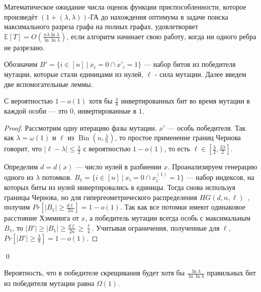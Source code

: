\documentclass[times]{itmo-student-thesis}
\newcommand{\ollga}{${(1 + (\lambda , \lambda))}$-ГА\xspace}
\DeclareMathOperator{\Bin}{Bin}
\begin{document}
\begin{theorem} \label{thm:time}
    Математическое ожидание числа оценок функции приспособленности, которое произведёт \ollga до нахождения оптимума в задаче поиска максимального разреза графа на полных графах, удовлетворяет $\mathbb{E}[T]=O(\frac{n\lambda \ln \lambda}{\ln \ln \lambda})$, если алгоритм начинает свою работу, когда ни одного ребра не разрезано.
\end{theorem}

Обозначим $B' = \{i \in [n] ~|~ x_i = 0 \cap x'_i = 1\}$ --- набор битов из победителя мутации, которые стали единицами из нулей,
$\ell$ - сила мутации. Далее введем две вспомогательные леммы.

\begin{lemma}\label{lem:mut1}
С вероятностью $1- o(1)$ хотя бы $\frac{\lambda}{8}$ инвертированных бит во время мутации в каждой особи --- это $0$, инвертированные в $1$.
\end{lemma}

\begin{proof}
Рассмотрим одну итерацию фазы мутации. $x'$ --- особь победителя.
Так как $\lambda = \omega(1)$ и $\ell$ из $\Bin\left(n, \frac{\lambda}{n}\right)$, то простое применение границ Чернова~\cite{ссылка} говорит, что $|\ell - \lambda| \le \frac{\lambda}{2}$ с вероятностью $1- o(1)$, то есть $\ell \in [\frac{\lambda}{2}, \frac{3\lambda}{2}]$.

Определим $d = d(x)$ --- число нулей в разбиении $x$. Проанализируем генерацию одного из $\lambda$ потомков. $B_1 = \{i \in [n] ~|~ x_i = 0 \cap x^{(1)}_i = 1\}$ --- набор индексов, на которых биты из нулей инвертировались в единицы. Тогда снова используя границы Чернова, но для гипергеометрического распределения $HG(d, n, \ell)$~\cite{ссылка}, получим $Pr[|B_1| \ge \frac{d\ell}{2n}] = 1 - o(1)$.
Так как все потомки имеют одинаковое расстояние Хэмминга от $x$, а победитель мутации всегда особь с максимальным $B_1$, то $|B'| \ge |B_1| \ge \frac{d\ell}{2n} \ge \frac{\ell}{4}$. Учитывая ограничения, полученные для $\ell$, $Pr[|B'| \ge \frac{\lambda}{8}] = 1 - o(1)$.
\end{proof}\qed

\begin{lemma}\label{lem:mut2}
Вероятность, что в победителе скрещивания будет хотя бы $\frac{\ln \lambda}{\ln \ln \lambda}$ правильных бит из победителя мутации равна $\Omega(1)$.
\end{lemma}
\end{document}
